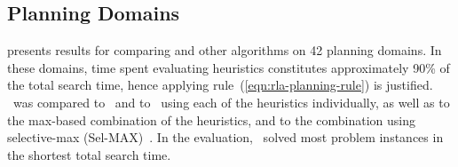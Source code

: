 \subsection{Planning Domains}

\cite{TolpinEtAl.rla} presents results for comparing \rationallazyastar and
other algorithms on 42 planning domains. In these domains, time spent evaluating
heuristics constitutes approximately 90\% of the total search time,
hence applying rule~(\ref{eqn:rla-planning-rule}) is justified. 
\rationallazyastar~was compared to \lazyastar~and to \astar~using
each of the heuristics individually, as well as to the max-based
combination of the heuristics, and to the combination using selective-max
(Sel-MAX)~\cite{domshlak-et-al:jair-2012}. In the evaluation, 
\rationallazyastar~solved most problem instances in the shortest
total search time.
